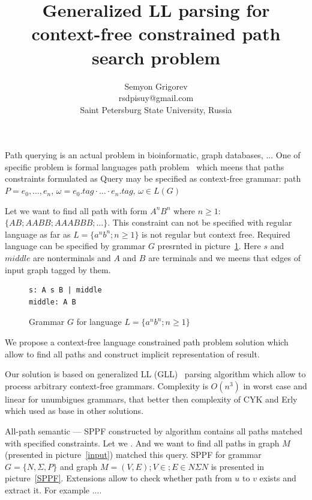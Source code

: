 \documentclass{sig-alternate} %
\begin{document}
\makeatletter
\def\@copyrightspace{\relax}
\makeatother

\title{Generalized LL parsing for context-free constrained path search problem}

\sloppy

\author{Semyon Grigorev\\
rsdpisuy@gmail.com\\
Saint Petersburg State University, Russia}

\maketitle

Path querying is an actual problem in bioinformatic, graph databases, ... One of specific problem is formal languages path problem~\cite{DirOfBigGraphAnalysis} which meens that paths constraints formulated as 
Query may be specified as context-free grammar: path $P = e_0,\dots,e_n$, $\omega = e_0.tag \cdot \dots \cdot e_n.tag$, $\omega \in L(G)$ 

Let we want to find all path with form $A^n B^n$ where $n \geq 1$: $\{AB; AABB; AAABBB; \dots\}$. This constraint can not be specified with regular language as far as $L=\{a^n b^n; n \geq 1\}$ is not regular but context free.
Required language can be specified by grammar $G$ presrnted in picture~\ref{grammarG}. Here $s$ and 
$middle$ are nonterminals and $A$ and $B$ are terminals and we meens that edges of input graph 
tagged by them.

\begin{figure}[h]
   \begin{center}
\begin{verbatim}
s: A s B | middle
middle: A B
\end{verbatim}
   \caption{Grammar $G$ for language $L=\{a^n b^n; n \geq 1\}$}
   \label{grammarG}        
   \end{center}
\end{figure}

We propose a context-free language constrained path problem solution which allow to find all paths and construct implicit representation of result. 

Our solution is based on generalized LL (GLL)~\cite{GLL} parsing algorithm which allow to process arbitrary context-free grammars.
Complexity is $O(n^3)$ in worst case and linear for unumbigues grammars, that better then complexity of CYK and Erly which used as base in other solutions.

All-path semantic --- SPPF constructed by algorithm contains all paths matched with specified constraints. 
Let we .  And we want to find all paths in graph $M$ (presented in picture~\ref{input}) matched this query. SPPF for grammar $G=\{N, \Sigma ,P\}$ and graph $M = (V,E); V \in ; E \in N \Sigma N$ 
is presented in picture~\ref{SPPF}. 
Extensions allow to check whether path from $u$ to $v$ exists and extract it. For example ....
\end{document}

